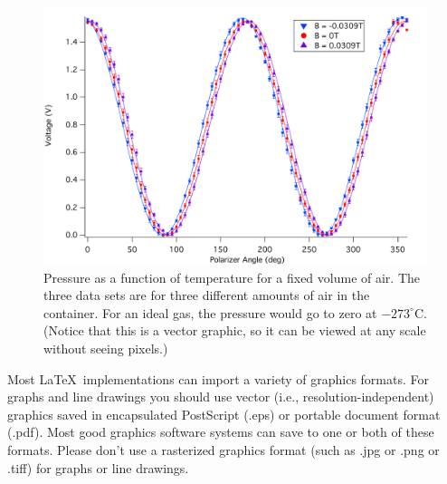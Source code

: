 \documentclass[prb,preprint]{revtex4-1}
\begin{document}
\begin{figure}[h!]
\centering
\includegraphics[width=180mm]{Faraday_Plot.pdf}
\caption{Pressure as a function of temperature for a fixed volume of air.  
The three data sets are for three different amounts of air in the container. 
For an ideal gas, the pressure would go to zero at $-273^\circ$C.  (Notice
that this is a vector graphic, so it can be viewed at any scale without
seeing pixels.)}
\label{Faraday_Plot}
\end{figure}

Most \LaTeX\ implementations can import a variety of graphics formats.
For graphs and line drawings you should use vector (i.e., resolution-independent)
graphics saved in encapsulated PostScript (.eps) or portable document
format (.pdf).  Most good graphics software systems can save to one 
or both of these formats.  Please don't use a rasterized graphics format
(such as .jpg or .png or .tiff) for graphs or line drawings.
\end{document}
